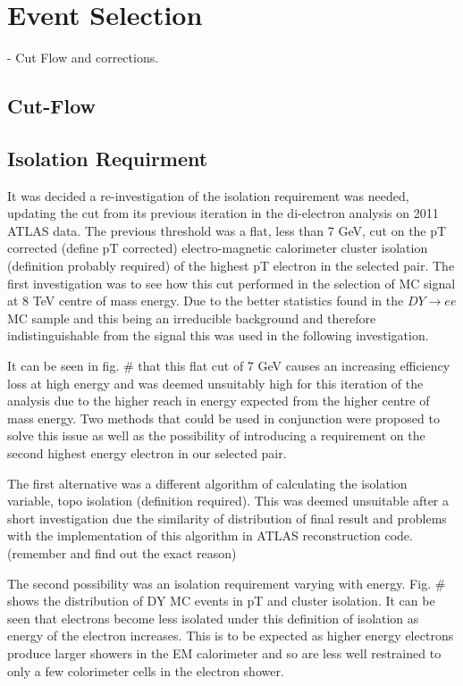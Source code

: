 \chapter{Event Selection }
{\normalsize - Cut Flow and corrections.}

\section{Cut-Flow}

\section{Isolation Requirment}

It was decided a re-investigation of the isolation requirement was needed, updating the cut from its previous iteration in the di-electron analysis on 2011 ATLAS data. The previous threshold was a flat, less than 7 GeV, cut on the pT corrected (define pT corrected) electro-magnetic calorimeter cluster isolation (definition probably required) of the highest pT electron in the selected pair. The first investigation was to see how this cut performed in the selection of MC signal at 8 TeV centre of mass energy. Due to the better statistics found in the $DY{\rightarrow}ee$ MC sample and this being an irreducible background and therefore indistinguishable from the signal this was used in the following investigation.

It can be seen in fig. \# that this flat cut of 7 GeV causes an increasing efficiency loss at high energy and was deemed unsuitably high for this iteration of the analysis due to the higher reach in energy expected from the higher centre of mass energy. Two methods that could be used in conjunction were proposed to solve this issue as well as the possibility of introducing a requirement on the second highest energy electron in our selected pair.

The first alternative was a different algorithm of calculating the isolation variable, topo isolation (definition required). This was deemed unsuitable after a short investigation due the similarity of distribution of final result and problems with the implementation of this algorithm in ATLAS reconstruction code. (remember and find out the exact reason)

The second possibility was an isolation requirement varying with energy. Fig. \# shows the distribution of DY MC events in pT and cluster isolation. It can be seen that electrons become less isolated under this definition of isolation as energy of the electron increases. This is to be expected as higher energy electrons produce larger showers in the EM calorimeter and so are less well restrained to only a few colorimeter cells in the electron shower. 

